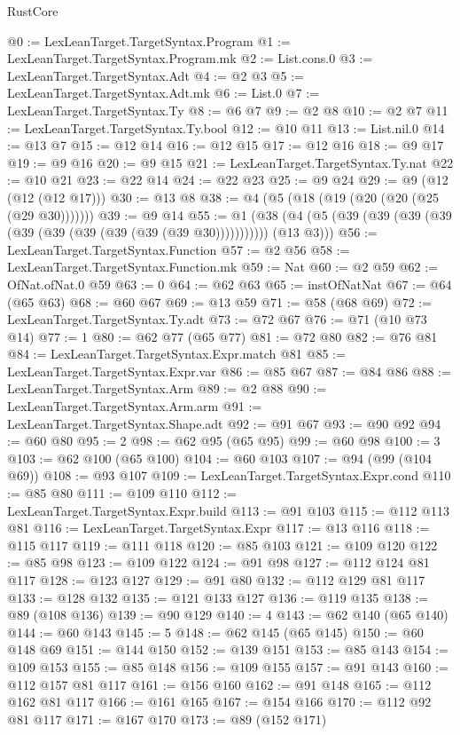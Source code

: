\begin{lexlean}{RustCore}
\begin{coremodule}
@0 := LexLeanTarget.TargetSyntax.Program
@1 := LexLeanTarget.TargetSyntax.Program.mk
@2 := List.cons.{0}
@3 := LexLeanTarget.TargetSyntax.Adt
@4 := @2 @3
@5 := LexLeanTarget.TargetSyntax.Adt.mk
@6 := List.{0}
@7 := LexLeanTarget.TargetSyntax.Ty
@8 := @6 @7
@9 := @2 @8
@10 := @2 @7
@11 := LexLeanTarget.TargetSyntax.Ty.bool
@12 := @10 @11
@13 := List.nil.{0}
@14 := @13 @7
@15 := @12 @14
@16 := @12 @15
@17 := @12 @16
@18 := @9 @17
@19 := @9 @16
@20 := @9 @15
@21 := LexLeanTarget.TargetSyntax.Ty.nat
@22 := @10 @21
@23 := @22 @14
@24 := @22 @23
@25 := @9 @24
@29 := @9 (@12 (@12 (@12 @17)))
@30 := @13 @8
@38 := @4 (@5 (@18 (@19 (@20 (@20 (@25 (@29 @30)))))))
@39 := @9 @14
@55 := @1 (@38 (@4 (@5 (@39 (@39 (@39 (@39 (@39 (@39 (@39 (@39 (@39 (@39 @30))))))))))) (@13 @3)))
@56 := LexLeanTarget.TargetSyntax.Function
@57 := @2 @56
@58 := LexLeanTarget.TargetSyntax.Function.mk
@59 := Nat
@60 := @2 @59
@62 := OfNat.ofNat.{0} @59
@63 := 0
@64 := @62 @63
@65 := instOfNatNat
@67 := @64 (@65 @63)
@68 := @60 @67
@69 := @13 @59
@71 := @58 (@68 @69)
@72 := LexLeanTarget.TargetSyntax.Ty.adt
@73 := @72 @67
@76 := @71 (@10 @73 @14)
@77 := 1
@80 := @62 @77 (@65 @77)
@81 := @72 @80
@82 := @76 @81
@84 := LexLeanTarget.TargetSyntax.Expr.match @81
@85 := LexLeanTarget.TargetSyntax.Expr.var
@86 := @85 @67
@87 := @84 @86
@88 := LexLeanTarget.TargetSyntax.Arm
@89 := @2 @88
@90 := LexLeanTarget.TargetSyntax.Arm.arm
@91 := LexLeanTarget.TargetSyntax.Shape.adt
@92 := @91 @67
@93 := @90 @92
@94 := @60 @80
@95 := 2
@98 := @62 @95 (@65 @95)
@99 := @60 @98
@100 := 3
@103 := @62 @100 (@65 @100)
@104 := @60 @103
@107 := @94 (@99 (@104 @69))
@108 := @93 @107
@109 := LexLeanTarget.TargetSyntax.Expr.cond
@110 := @85 @80
@111 := @109 @110
@112 := LexLeanTarget.TargetSyntax.Expr.build
@113 := @91 @103
@115 := @112 @113 @81
@116 := LexLeanTarget.TargetSyntax.Expr
@117 := @13 @116
@118 := @115 @117
@119 := @111 @118
@120 := @85 @103
@121 := @109 @120
@122 := @85 @98
@123 := @109 @122
@124 := @91 @98
@127 := @112 @124 @81 @117
@128 := @123 @127
@129 := @91 @80
@132 := @112 @129 @81 @117
@133 := @128 @132
@135 := @121 @133 @127
@136 := @119 @135
@138 := @89 (@108 @136)
@139 := @90 @129
@140 := 4
@143 := @62 @140 (@65 @140)
@144 := @60 @143
@145 := 5
@148 := @62 @145 (@65 @145)
@150 := @60 @148 @69
@151 := @144 @150
@152 := @139 @151
@153 := @85 @143
@154 := @109 @153
@155 := @85 @148
@156 := @109 @155
@157 := @91 @143
@160 := @112 @157 @81 @117
@161 := @156 @160
@162 := @91 @148
@165 := @112 @162 @81 @117
@166 := @161 @165
@167 := @154 @166
@170 := @112 @92 @81 @117
@171 := @167 @170
@173 := @89 (@152 @171)

\end{coremodule}
\end{lexlean}
